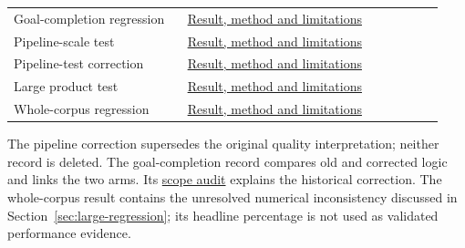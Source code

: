 \begin{longtable}{@{}L{0.38\linewidth}L{0.57\linewidth}@{}}
\label{study-H}Goal-completion regression & \href{https://github.com/horiiiiii032929/digital-twin/blob/main/research/05_evaluation/goal-completion-scope-development-001-results.md}{Result, method and limitations} \\
\label{study-L1}Pipeline-scale test & \href{https://github.com/horiiiiii032929/digital-twin/blob/main/research/05_evaluation/factual-qa-v3-scale-completion-10000-001-results.md}{Result, method and limitations} \\
\label{study-L1c}Pipeline-test correction & \href{https://github.com/horiiiiii032929/digital-twin/blob/main/research/05_evaluation/factual-qa-v3-scale-completion-10000-001-analysis-correction-001-results.md}{Result, method and limitations} \\
\label{study-L2}Large product test & \href{https://github.com/horiiiiii032929/digital-twin/blob/main/research/05_evaluation/course-digital-twin-evaluation-program-011-results.md}{Result, method and limitations} \\
\label{study-L3}Whole-corpus regression & \href{https://github.com/horiiiiii032929/digital-twin/blob/main/research/05_evaluation/academic-factual-qa-open-10000-winner-regression-001-results.md}{Result, method and limitations} \\
\bottomrule\end{longtable}
The pipeline correction supersedes the original quality interpretation; neither
record is deleted. The goal-completion record compares old and corrected logic
and links the two arms. Its \href{https://github.com/horiiiiii032929/digital-twin/blob/main/research/05_evaluation/goal-completion-scope-review-audit-001-results.md}{scope audit}
explains the historical correction. The whole-corpus result contains the unresolved
numerical inconsistency discussed in Section~\ref{sec:large-regression}; its
headline percentage is not used as validated performance evidence.
